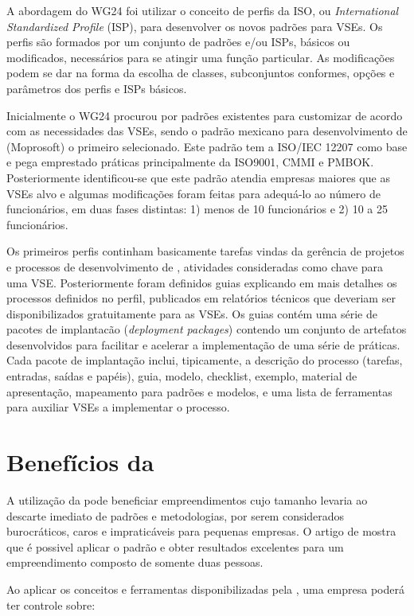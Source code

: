 A abordagem do WG24 foi utilizar o conceito de perfis da ISO, ou \textit{International Standardized Profile} (ISP), para desenvolver os novos padrões para VSEs. Os perfis são formados por um conjunto de padrões e/ou ISPs, básicos ou modificados, necessários para se atingir uma função particular. As modificações podem se dar na forma da escolha de classes, subconjuntos conformes, opções e parâmetros dos perfis e ISPs básicos.

Inicialmente o WG24 procurou por padrões existentes para customizar de acordo com as necessidades das VSEs, sendo o padrão mexicano para desenvolvimento de \sw (Moprosoft) o primeiro selecionado. Este padrão tem a ISO/IEC 12207 como base e pega emprestado práticas principalmente da ISO9001, CMMI e PMBOK. Posteriormente identificou-se que este padrão atendia empresas maiores que as VSEs alvo e algumas modificações foram feitas para adequá-lo ao número de funcionários, em duas fases distintas: 1) menos de 10 funcionários e 2) 10 a 25 funcionários.

Os primeiros perfis continham basicamente tarefas vindas da gerência de projetos e processos de desenvolvimento de \sw, atividades consideradas como chave para uma VSE. Posteriormente foram definidos guias explicando em mais detalhes os processos definidos no perfil, publicados em relatórios técnicos que deveriam ser disponibilizados gratuitamente para as VSEs. Os guias contém uma série de pacotes de implantacão (\textit{deployment packages}) contendo um conjunto de artefatos desenvolvidos para facilitar e acelerar a implementação de uma série de práticas. Cada pacote de implantação inclui, tipicamente, a descrição do processo (tarefas, entradas, saídas e papéis), guia, modelo, checklist, exemplo, material de apresentação, mapeamento para padrões e modelos, e uma lista de ferramentas para auxiliar VSEs a implementar o processo.

\section{Benefícios da \iso}

A utilização da \iso pode beneficiar empreendimentos cujo tamanho levaria ao descarte imediato de padrões e metodologias, por serem considerados burocráticos, caros e impraticáveis para pequenas empresas. O artigo de \cite{swicetrip} mostra que é possivel aplicar o padrão e obter resultados excelentes para um empreendimento composto de somente duas pessoas.

Ao aplicar os conceitos e ferramentas disponibilizadas pela \iso, uma empresa poderá ter controle sobre:

